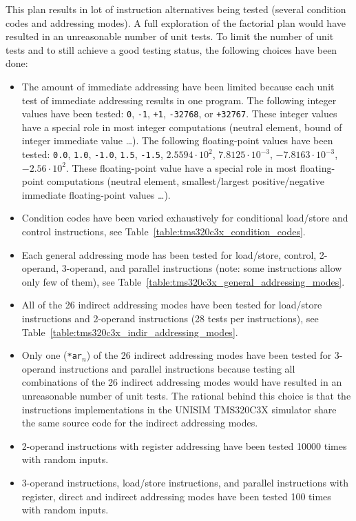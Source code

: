 This plan results in lot of instruction alternatives being tested (several condition codes and addressing modes).
A full exploration of the factorial plan would have resulted in an unreasonable number of unit tests.
To limit the number of unit tests and to still achieve a good testing status, the following choices have been done:
\begin{itemize}
\item The amount of immediate addressing have been limited because each unit test of immediate addressing results in one program. The following integer values have been tested: \texttt{0}, \texttt{-1}, \texttt{+1}, \texttt{-32768}, or \texttt{+32767}. These integer values have a special role in most integer computations (neutral element, bound of integer immediate value \ldots). The following floating-point values have been tested: \texttt{0.0}, \texttt{1.0}, \texttt{-1.0}, \texttt{1.5}, \texttt{-1.5}, \texttt{$2.5594 \cdot 10^2$}, \texttt{$7.8125 \cdot 10^{-3}$}, \texttt{$-7.8163 \cdot 10^{-3}$}, \texttt{$-2.56 \cdot 10^2$}. These floating-point value have a special role in most floating-point computations (neutral element, smallest/largest positive/negative immediate floating-point values \ldots).
\item Condition codes have been varied exhaustively for conditional load/store and control instructions, see Table~\ref{table:tms320c3x_condition_codes}.
\item Each general addressing mode has been tested for load/store, control, 2-operand, 3-operand, and parallel instructions (note: some instructions allow only few of them), see Table~\ref{table:tms320c3x_general_addressing_modes}.
\item All of the 26 indirect addressing modes have been tested for load/store instructions and 2-operand instructions (28 tests per instructions), see Table~\ref{table:tms320c3x_indir_addressing_modes}.
\item Only one (\texttt{*ar$_n$}) of the 26 indirect addressing modes have been tested for 3-operand instructions and parallel instructions because testing all combinations of the 26 indirect addressing modes would have resulted in an unreasonable number of unit tests.
The rational behind this choice is that the instructions implementations in the UNISIM TMS320C3X simulator share the same source code for the indirect addressing modes.
\item 2-operand instructions with register addressing have been tested 10000 times with random inputs.
\item 3-operand instructions, load/store instructions, and parallel instructions with register, direct and indirect addressing modes have been tested 100 times with random inputs.

\end{itemize}
